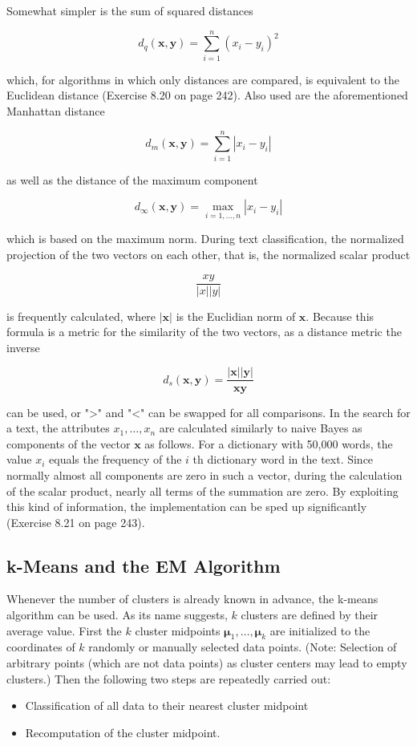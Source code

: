 \documentclass[10pt]{book}
\begin{document}
Somewhat simpler is the sum of squared distances

$$
d_{q}(\boldsymbol{x}, \boldsymbol{y})=\sum_{i=1}^{n}\left(x_{i}-y_{i}\right)^{2}
$$

which, for algorithms in which only distances are compared, is equivalent to the Euclidean distance (Exercise 8.20 on page 242). Also used are the aforementioned Manhattan distance

$$
d_{m}(\boldsymbol{x}, \boldsymbol{y})=\sum_{i=1}^{n}\left|x_{i}-y_{i}\right|
$$

as well as the distance of the maximum component

$$
d_{\infty}(\boldsymbol{x}, \boldsymbol{y})=\max _{i=1, \ldots, n}\left|x_{i}-y_{i}\right|
$$

which is based on the maximum norm. During text classification, the normalized projection of the two vectors on each other, that is, the normalized scalar product

$$
\frac{x y}{|x||y|}
$$

is frequently calculated, where $|\boldsymbol{x}|$ is the Euclidian norm of $\boldsymbol{x}$. Because this formula is a metric for the similarity of the two vectors, as a distance metric the inverse

$$
d_{s}(\boldsymbol{x}, \boldsymbol{y})=\frac{|\boldsymbol{x}||\boldsymbol{y}|}{\boldsymbol{x} \boldsymbol{y}}
$$

can be used, or ">" and "<" can be swapped for all comparisons. In the search for a text, the attributes $x_{1}, \ldots, x_{n}$ are calculated similarly to naive Bayes as components of the vector $\boldsymbol{x}$ as follows. For a dictionary with 50,000 words, the value $x_{i}$ equals the frequency of the $i$ th dictionary word in the text. Since normally almost all components are zero in such a vector, during the calculation of the scalar product, nearly all terms of the summation are zero. By exploiting this kind of information, the implementation can be sped up significantly (Exercise 8.21 on page 243).

\subsection{k-Means and the EM Algorithm}
Whenever the number of clusters is already known in advance, the k-means algorithm can be used. As its name suggests, $k$ clusters are defined by their average value. First the $k$ cluster midpoints $\boldsymbol{\mu}_{1}, \ldots, \boldsymbol{\mu}_{k}$ are initialized to the coordinates of $k$ randomly or manually selected data points. (Note: Selection of arbitrary points (which are not data points) as cluster centers may lead to empty clusters.) Then the following two steps are repeatedly carried out:
\begin{itemize}
  \item Classification of all data to their nearest cluster midpoint
  \item Recomputation of the cluster midpoint.
\end{itemize}
\end{document}
